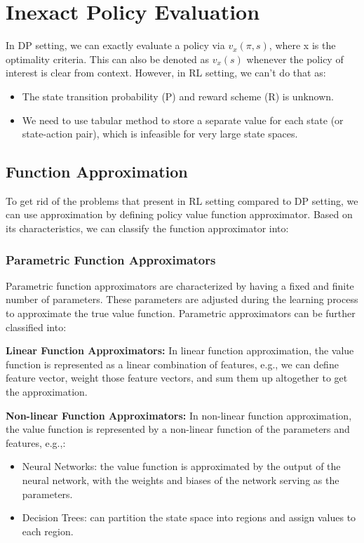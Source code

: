 \section{Inexact Policy Evaluation}

In DP setting, we can exactly evaluate a policy via \(v_x(\pi, s)\), where x is the optimality criteria. This can also be denoted as $v_x(s)$ whenever the policy of interest is clear from context. However, in RL setting, we can't do that as:
\begin{itemize}
    \item The state transition probability (P) and reward scheme (R) is unknown.
    \item We need to use tabular method to store a separate value for each state (or state-action pair), which is infeasible for very large state spaces.
\end{itemize}

\subsection{Function Approximation}
To get rid of the problems that present in RL setting compared to DP setting, we can use approximation by defining policy value function approximator. Based on its characteristics, we can classify the function approximator into:

\subsubsection{Parametric Function Approximators}
Parametric function approximators are characterized by having a fixed and finite number of parameters. These parameters are adjusted during the learning process to approximate the true value function. Parametric approximators can be further classified into:

\textbf{Linear Function Approximators:}
In linear function approximation, the value function is represented as a linear combination of features, e.g., we can define feature vector, weight those feature vectors, and sum them up altogether to get the approximation. 

\textbf{Non-linear Function Approximators:}
In non-linear function approximation, the value function is represented by a non-linear function of the parameters and features, e.g.,:
\begin{itemize}
    \item Neural Networks: the value function is approximated by the output of the neural network, with the weights and biases of the network serving as the parameters.
    \item Decision Trees: can partition the state space into regions and assign values to each region.
\end{itemize}

